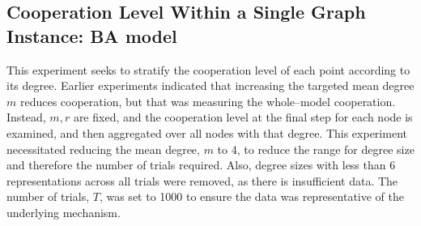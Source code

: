 \subsection{Cooperation Level Within a Single Graph Instance: BA model } 
This experiment seeks to stratify the cooperation level of each point according to its degree. Earlier experiments indicated that increasing the targeted mean degree $m$ reduces cooperation, but that was measuring the whole--model cooperation. Instead, $m, r$ are fixed, and the cooperation level at the final step for each node is examined, and then aggregated over all nodes with that degree. This experiment necessitated reducing the mean degree, $m$ to 4, to reduce the range for degree size and therefore the number of trials required. Also, degree sizes with less than 6 representations across all trials were removed, as there is insufficient data. The number of trials, $T$, was set to 1000 to ensure the data was representative of the underlying mechanism. \\

